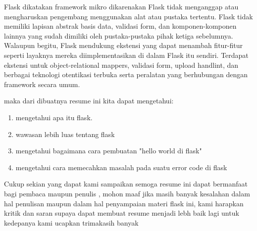 \documentclass[12pt]{article}
\begin{document}
Flask dikatakan framework mikro dikarenakan Flask tidak menganggap atau mengharuskan pengembang menggunakan alat atau pustaka tertentu. Flask tidak memiliki lapisan abstrak basis data, validasi form, dan komponen-komponen lainnya yang sudah dimiliki oleh pustaka-pustaka pihak ketiga sebelumnya. Walaupun begitu, Flask mendukung ekstensi yang dapat menambah fitur-fitur seperti layaknya mereka diimplementasikan di dalam Flask itu sendiri. Terdapat ekstensi untuk object-relational mappers, validasi form, upload handlint, dan berbagai teknologi otentikasi terbuka serta peralatan yang berhubungan dengan framework secara umum\cite{solihin2016implementasi}. 

maka dari dibuatnya resume ini kita dapat mengetahui: 
	
\begin{enumerate}
\item mengetahui apa itu flask.
\item wawasan lebih luas tentang flask
\item mengetahui bagaimana cara pembuatan "hello world di flask"
\item mengetahui cara memecahkan masalah pada suatu error code di flask
\end{enumerate}	


Cukup sekian yang dapat kami sampaikan semoga resume ini dapat bermanfaat bagi pembaca maupun penulis , mohon maaf jika masih banyak kesalahan dalam hal penulisan maupun dalam hal penyampaian materi flask ini, kami harapkan kritik dan saran supaya dapat membuat resume menjadi lebh baik lagi untuk kedepanya kami ucapkan trimakasih banyak  
\end{document}
